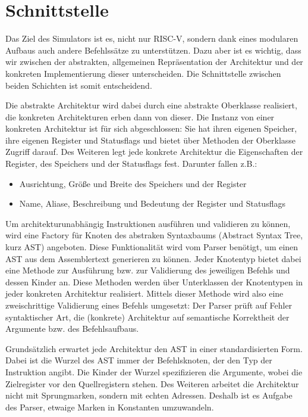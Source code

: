 \section{Schnittstelle}

Das Ziel des Simulators ist es, nicht nur RISC-V, sondern dank eines modularen Aufbaus auch andere Befehlssätze zu unterstützen. Dazu aber ist es wichtig, dass wir zwischen der abstrakten, allgemeinen Repräsentation der Architektur und der konkreten Implementierung dieser unterscheiden. Die Schnittstelle zwischen beiden Schichten ist somit entscheidend.

Die abstrakte Architektur wird dabei durch eine abstrakte Oberklasse realisiert, die konkreten Architekturen erben dann von dieser. Die Instanz von einer konkreten Architektur ist für sich abgeschlossen: Sie hat ihren eigenen Speicher, ihre eigenen Register und Statusflags und bietet über Methoden der Oberklasse Zugriff darauf. Des Weiteren legt jede konkrete Architektur die Eigenschaften der Register, des Speichers und der Statusflags fest. Darunter fallen z.B.:

\begin{itemize}
\item Ausrichtung, Größe und Breite des Speichers und der Register
\item Name, Aliase, Beschreibung und Bedeutung der Register und Statusflags
\end{itemize}

Um architekturunabhängig Instruktionen ausführen und validieren zu können, wird eine Factory für Knoten des abstraken Syntaxbaums (Abstract Syntax Tree, kurz AST) angeboten. Diese Funktionalität wird vom Parser benötigt, um einen AST aus dem Assemblertext generieren zu können. Jeder Knotentyp bietet dabei eine Methode zur Ausführung bzw. zur Validierung des jeweiligen Befehls und dessen Kinder an. Diese Methoden werden über Unterklassen der Knotentypen in jeder konkreten Architektur realisiert. Mittels dieser Methode wird also eine zweischrittige Validierung eines Befehls umgesetzt: Der Parser prüft auf Fehler syntaktischer Art, die (konkrete) Architektur auf semantische Korrektheit der Argumente bzw. des Befehlsaufbaus.

Grundsätzlich erwartet jede Architektur den AST in einer standardisierten Form. Dabei ist die Wurzel des AST immer der Befehlsknoten, der den Typ der Instruktion angibt. Die Kinder der Wurzel spezifizieren die Argumente, wobei die Zielregister vor den Quellregistern stehen. Des Weiteren arbeitet die Architektur nicht mit Sprungmarken, sondern mit echten Adressen. Deshalb ist es Aufgabe des Parser, etwaige Marken in Konstanten umzuwandeln.